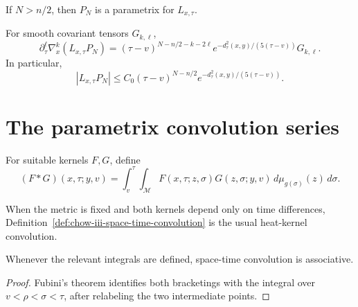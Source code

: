 \begin{proposition}
\label{prop:chow-iii-evolving-parametrix}
If \(N>n/2\), then \(P_N\) is a parametrix for \(L_{x,\tau}\).
\end{proposition}

\begin{lemma}
\label{lem:chow-iii-cutoff-parametrix-error-derivatives}
For smooth covariant tensors \(G_{k,\ell}\),
\[
 \partial_\tau^\ell\nabla_x^k(L_{x,\tau}P_N)
 =(\tau-v)^{N-n/2-k-2\ell}
 e^{-d_\tau^2(x,y)/(5(\tau-v))}G_{k,\ell}.
\]
In particular,
\[
 |L_{x,\tau}P_N|\le C_0(\tau-v)^{N-n/2}
 e^{-d_\tau^2(x,y)/(5(\tau-v))}.
\]
\end{lemma}

\section{The parametrix convolution series}

\begin{definition}
\label{def:chow-iii-space-time-convolution}
For suitable kernels \(F,G\), define
\[
 (F*G)(x,\tau;y,v)=\int_v^\tau\!\int_{\mathcal M}
 F(x,\tau;z,\sigma)G(z,\sigma;y,v)
 \,d\mu_{g(\sigma)}(z)\,d\sigma.
\]
\end{definition}

\begin{remark}
\label{rem:chow-iii-static-convolution}
When the metric is fixed and both kernels depend only on time differences,
Definition~\ref{def:chow-iii-space-time-convolution} is the usual heat-kernel
convolution.
\end{remark}

\begin{lemma}
\label{lem:chow-iii-space-time-convolution-associative}
Whenever the relevant integrals are defined, space-time convolution is
associative.
\end{lemma}
\begin{proof}
Fubini's theorem identifies both bracketings with the integral over
\(v<\rho<\sigma<\tau\), after relabeling the two intermediate points.
\end{proof}


